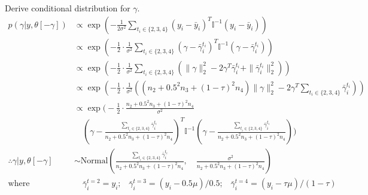 \documentclass[12pt,letterpaper,twoside]{article}
\begin{document}
Derive conditional distribution for $\gamma$.
\begin{align*}
    p(\gamma|y,\theta[-\gamma]) & \propto \exp\left(-\frac{1}{2\sigma^2} \sum_{t_i \in \{2,3,4\}} (y_i - \bar{y}_i)^T \mathbb{I}^{-1} (y_i - \bar{y}_i) \right) \\ %
        & \propto \exp\left(-\frac{1}{2} \cdot \frac{1}{\sigma^2} \sum_{t_i \in \{2,3,4\}} (\gamma - \bar{\gamma}_i^{t_i})^T \mathbb{I}^{-1} (\gamma - \bar{\gamma}_i^{t_i}) \right) \\ %
        & \propto \exp\left(-\frac{1}{2} \cdot \frac{1}{\sigma^2} \sum_{t_i \in \{2,3,4\}} \left(\|\gamma\|^2_2 - 2\gamma^T \bar{\gamma}_i^{t_i} + \|\bar{\gamma}_i^{t_i}\|^2_2 \right)\right) \\ %
        & \propto \exp\left(-\frac{1}{2} \cdot \frac{1}{\sigma^2} \left((n_2 + 0.5^2 n_3 + (1-\tau)^2 n_4)\|\gamma\|^2_2 - 2\gamma^T \sum_{t_i \in \{2,3,4\}} \bar{\gamma}_i^{t_i} \right)\right) \\ %
        & \propto \exp\biggl(-\frac{1}{2} \cdot \frac{n_2 + 0.5^2 n_3 + (1-\tau)^2 n_4}{\sigma^2} \\ %
        & \quad \left(\gamma - \frac{\sum_{t_i \in \{2,3,4\}} \bar{\gamma}_i^{t_i}}{n_2 + 0.5^2 n_3 + (1-\tau)^2 n_4} \right)^T \mathbb{I}^{-1} \left(\gamma - \frac{\sum_{t_i \in \{2,3,4\}} \bar{\gamma}_i^{t_i}}{n_2 + 0.5^2 n_3 + (1-\tau)^2 n_4} \right)\biggr) && \\
    \therefore \gamma | y, \theta[-\gamma] & \sim \text{Normal}\left( \frac{\sum_{t_i \in \{2,3,4\}} \bar{\gamma}_i^{t_i}}{n_2 + 0.5^2 n_3 + (1-\tau)^2 n_4}, \quad \frac{\sigma^2}{n_2 + 0.5^2 n_3 + (1-\tau)^2 n_4} \right) \\
    \text{where} & \quad \bar{\gamma}_i^{t=2} = y_i \text{;} \quad \bar{\gamma}_i^{t=3} = (y_i - 0.5\mu) / 0.5 \text{;} \quad \bar{\gamma}_i^{t=4} = (y_i - \tau\mu) / (1-\tau) 
\end{align*}
\end{document}
